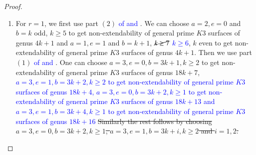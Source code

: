 \documentclass[11pt,twoside]{amsart}
\theoremstyle{plain}
\numberwithin{equation}{section}
\theoremstyle{definition}
\begin{document}
\begin{proof}
\begin{enumerate}
        \item[(5)] For $r = 1$, we first use part $(2)$ \textcolor{blue}{of  and }. We can choose $a = 2, e = 0$  and $b = k$ odd, $k \geq 5$ to get non-extendability of general prime $K3$ surfaces of genus $4k+1$ and $a = 1, e = 1$  and $b = k+1$, $\cancel{k \geq 7}$ \textcolor{blue}{$k \geq 6$}, $k$ even to get non-extendability of general prime $K3$ surfaces of genus $4k+1$. Then we use part $(1)$ \textcolor{blue}{of  and }. One can choose $a = 3, e = 0, b = 3k+1, k \geq 2$ to get non-extendability of general prime $K3$ surfaces of genus $18k+7$, \textcolor{blue}{$a = 3, e = 1, b = 3k+2, k \geq 2$ to get non-extendability of general prime $K3$ surfaces of genus $18k+4$, $a = 3, e = 0, b = 3k+2, k \geq 1$ to get non-extendability of general prime $K3$ surfaces of genus $18k+13$ and $a = 3, e = 1, b = 3k+4, k \geq 1$ to get non-extendability of general prime $K3$ surfaces of genus $18k+16$ } \sout{Similarly the rest follows by choosing $a = 3, e = 0, b = 3k+2, k \geq 1$, $a = 3, e = 1, b = 3k+i, k \geq 2$ and $i = 1,2$.}
       
       
       
        

        
     
    \end{enumerate}
\end{proof}
\end{document}

